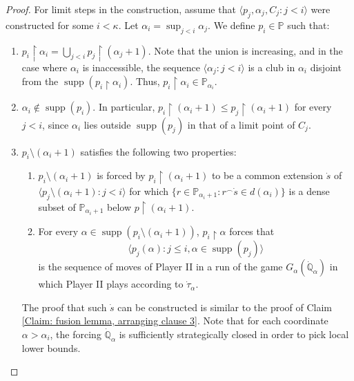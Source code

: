 \documentclass[11pt]{amsart}
\renewcommand{\restriction}{\mathbin\upharpoonright}    %
\theoremstyle{definition}
\theoremstyle{remark}
\newcommand\<{{<}}
\DeclareMathOperator{\supp}{supp}
\newcommand{\po}{\mathbb{P}}
\newcommand{\qo}{\mathbb{Q}}
\newcommand{\la}{\langle}
\newcommand{\ra}{\rangle}
\begin{document}
\begin{proof}
    For limit steps in the construction, assume that $\la p_j, \alpha_j , C_j \colon j<i \ra$ were constructed for some $i<\kappa$. Let $\alpha_i = \sup_{j<i}\alpha_j$. We define $p_i \in \po$ such that:
    \begin{enumerate}
     \item $p_i\restriction \alpha_{i} = \bigcup_{j<i} p_j \restriction (\alpha_j+1)$. Note that the union is increasing, and in the case where $\alpha_i$ is inaccessible, the sequence $\la \alpha_j \colon j<i \ra$ is a club in $\alpha_i$ disjoint from the $\supp(p_i\restriction \alpha_i)$. Thus,  $p_i\restriction \alpha_i\in \po_{\alpha_i}$.
        \item $\alpha_i \notin \supp(p_i)$. In particular, $p_i\restriction (\alpha_i+1 )\leq p_j \restriction (\alpha_i+1)$ for every $j<i$, since $\alpha_i$ lies outside $\supp(p_j)$  in that of a  limit point of $C_j$.
        \item $p_{i}\setminus (\alpha_{i}+1)$ satisfies the following two properties:
        \begin{enumerate}
            \item $p_i\setminus (\alpha_i+1)$ is forced by $p_i\restriction (\alpha_i+1)$ to be a common extension $\dot{s}$ of $\la p_j \setminus (\alpha_i+1) \colon j<i \ra$ for which $\{  r\in \po_{\alpha_i+1} \colon r^{\frown} \dot{s} \in d(\alpha_i) \}$ is a dense subset of $\po_{\alpha_i+1}$ below $p\restriction (\alpha_{i}+1)$.
            \item For every $\alpha\in \supp(p_{i}\setminus (\alpha_{i}+1))$, $p_{i}\restriction \alpha$ forces that $$\la p_j(\alpha) \colon j\leq i, \alpha\in \supp(p_j) \ra$$ is the sequence of moves of Player II in a run of the game $G_\alpha(\dot{\qo}_\alpha)$ in which Player II plays according to $\dot{\tau}_\alpha$.
        \end{enumerate}
        The proof that such $\dot{s}$ can be constructed is similar to the proof of Claim \ref{Claim: fusion lemma, arranging clause 3}. Note that for each coordinate $\alpha > \alpha_i$, the forcing $\dot{\qo}_\alpha$ is sufficiently strategically closed in order to pick local lower bounds.
    \end{enumerate}


\end{proof}
\end{document}
